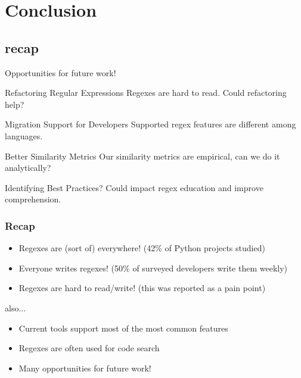 \section{Conclusion}
\subsection{recap}


\begin{frame}{Opportunities for future work!}


\begin{block}{Refactoring Regular Expressions}
Regexes are hard to read. Could refactoring help? 
\end{block}


\begin{block}{Migration Support for Developers}
Supported regex features are different among languages.
\end{block}


\begin{block}{Better Similarity Metrics}
Our similarity metrics are empirical, can we do it analytically?
\end{block}


\begin{block}{Identifying Best Practices?}
Could impact regex education and improve comprehension. 
\end{block}

\end{frame}

\begin{frame}
\frametitle{Recap}

\begin{itemize}
\item Regexes are (sort of) everywhere! (42\% of Python projects studied)
\item<2-> Everyone writes regexes! (50\% of surveyed developers write them weekly)
\item<3-> Regexes are hard to read/write! (this was reported as a pain point)
\end{itemize}

also...

\begin{itemize}
\item Current tools support most of the most common features
\item Regexes are often used for code search
\item Many opportunities for future work!
\end{itemize}


\end{frame}


